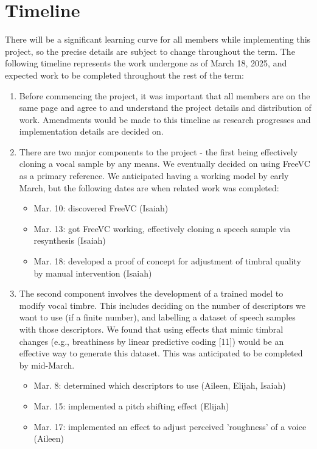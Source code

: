 \documentclass{article}
\begin{document}
\section{Timeline}\label{sec:page_size}

There will be a significant learning curve for all members while implementing this project, so the precise details are subject to change throughout the term. The following timeline represents the work undergone as of March 18, 2025, and expected work to be completed throughout the rest of the term:

\begin{enumerate}
  \item Before commencing the project, it was important that all members are on the same page and agree to and understand the project details and distribution of work. Amendments would be made to this timeline as research progresses and implementation details are decided on.
  \item There are two major components to the project - the first being effectively cloning a vocal sample by any means. We eventually decided on using FreeVC as a primary reference. We anticipated having a working model by early March, but the following dates are when related work was completed:
    \begin{itemize}
      \item Mar. 10: discovered FreeVC (Isaiah)
      \item Mar. 13: got FreeVC working, effectively cloning a speech sample via resynthesis (Isaiah)
      \item Mar. 18: developed a proof of concept for adjustment of timbral quality by manual intervention (Isaiah)
    \end{itemize}
  \item The second component involves the development of a trained model to modify vocal timbre. This includes deciding on the number of descriptors we want to use (if a finite number), and labelling a dataset of speech samples with those descriptors. We found that using effects that mimic timbral changes (e.g., breathiness by linear predictive coding [11]) would be an effective way to generate this dataset. This was anticipated to be completed by mid-March.
    \begin{itemize}
      \item Mar. 8: determined which descriptors to use (Aileen, Elijah, Isaiah)
      \item Mar. 15: implemented a pitch shifting effect (Elijah)
      \item Mar. 17: implemented an effect to adjust perceived 'roughness' of a voice (Aileen)

\end{itemize}
\end{enumerate}
\end{document}

